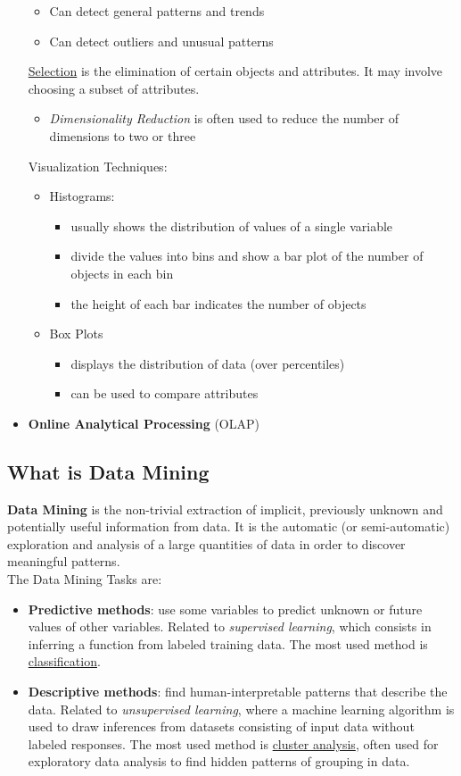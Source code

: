 \documentclass[10pt,a4paper]{article}
\begin{document}
\begin{itemize}
\begin{itemize}
			\item Can detect general patterns and trends
			\item Can detect outliers and unusual patterns
	\end{itemize}
	\uline{Selection} is the elimination of certain objects and attributes. It may involve choosing a subset of attributes.
	\begin{itemize}
		\item \textit{Dimensionality Reduction} is often used to reduce the number of dimensions to two or three
	\end{itemize}
	Visualization Techniques:
	\begin{itemize}
		\item Histograms:
		\begin{itemize}
			\item usually shows the distribution of values of a single variable
			\item divide the values into bins and show a bar plot of the number of objects in each bin
			\item  the height of each bar indicates the number of objects
\end{itemize}		 
		\item Box Plots 
		\begin{itemize}
			\item displays the distribution of data (over percentiles)
			\item can be used to compare attributes
		\end{itemize}
	\end{itemize}
	\item \textbf{Online Analytical Processing} (OLAP)
\end{itemize}
\subsection{What is Data Mining}
\textbf{Data Mining} is the non-trivial extraction of implicit, previously unknown and potentially useful information from data. It is the automatic (or semi-automatic) exploration and analysis of a large quantities of data in order to discover meaningful patterns. \\
The Data Mining Tasks are:
\begin{itemize}
	\item \textbf{Predictive methods}: use some variables to predict unknown or future values of other variables. Related to \textit{supervised learning}, which consists in inferring a function from labeled training data. The most used method is \uline{classification}.
	\item \textbf{Descriptive methods}: find human-interpretable patterns that describe the data. Related to \textit{unsupervised learning}, where a machine learning algorithm is used to draw inferences from datasets consisting of input data without labeled responses. The most used method is \uline{cluster analysis}, often used for exploratory data analysis to find hidden patterns of grouping in data.
\end{itemize}
\end{document}

